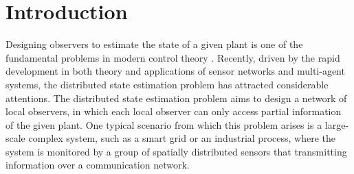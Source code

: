 \documentclass[twocolumn]{autart}
\begin{document}
\section{Introduction}
Designing observers to estimate the state of a given plant is one of the fundamental problems in modern control theory \citep{Luenberger71}.
Recently, driven by the rapid development in both theory and applications of sensor networks and multi-agent systems,
the distributed state estimation problem has attracted considerable attentions.
The distributed state estimation problem aims to design a network of local observers,
in which each local observer can only access partial information of the given plant.
One typical scenario from which this problem arises is
a large-scale complex system, such as a smart grid or an industrial process,
where the system is monitored by a group of spatially distributed sensors
that transmitting information over a communication network.
\end{document}

